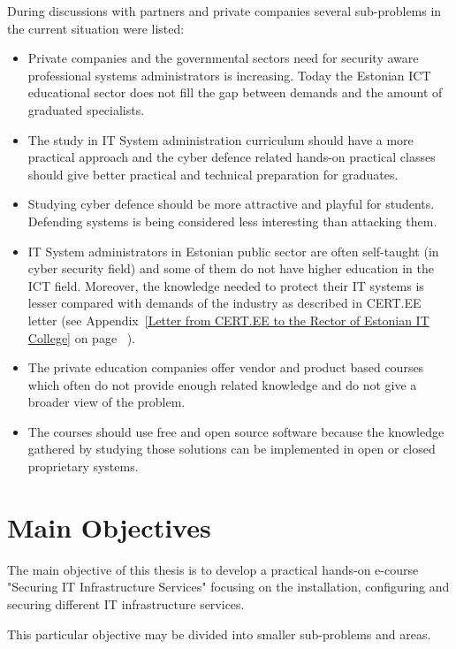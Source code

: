 During discussions with partners and private companies several sub-problems in the current situation were listed:
\begin{itemize}
\item Private companies and the governmental sectors need for security aware professional systems administrators  is increasing. Today the Estonian \gls{ICT} educational sector does not fill the gap between demands and the amount of graduated specialists.
\item The study in IT System administration curriculum should have a more practical approach and the cyber defence related hands-on practical classes should give better practical and technical preparation for graduates.
\item Studying cyber defence should be more attractive and playful for students. Defending systems is being considered less interesting than attacking them.
\item IT System administrators in Estonian public sector are often self-taught (in cyber security field) and some of them do not have higher education in the \gls{ICT} field. Moreover, the knowledge needed to protect their IT systems is lesser compared with demands of the industry as described in CERT.EE letter (see Appendix~\ref{Letter from CERT.EE to the Rector of Estonian IT College} on page ~\pageref{Letter from CERT.EE to the Rector of Estonian IT College}).
\item The private education companies offer vendor and product based courses which often do not provide enough related knowledge and do not give a broader view of the problem.
\item The courses should use free and open source software because the knowledge gathered by studying those solutions can be implemented in open or closed proprietary systems.
\end{itemize}

\section{Main Objectives}

The main objective of this thesis is to develop a practical hands-on e-course "Securing IT Infrastructure Services" focusing on the installation, configuring and securing different IT infrastructure services.

This particular objective may be divided into smaller sub-problems and areas.



